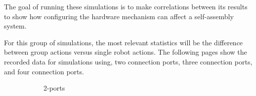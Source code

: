 The goal of running these simulations is to make correlations between its results to show how configuring the hardware mechanism can affect a self-assembly system.

For this group of simulations, the most relevant statistics will be the difference between group actions versus single robot actions.
The following pages show the recorded data for simulations using, two connection ports, three connection ports, and four connection ports.


\begin{figure}[H]
	\centering
	\begin{subfigure}[b]{0.31\textwidth}
		\centering
		\caption{2-ports}
	\end{subfigure}
	\begin{subfigure}[b]{0.31\textwidth}
		\centering

\end{subfigure}
\end{figure}
